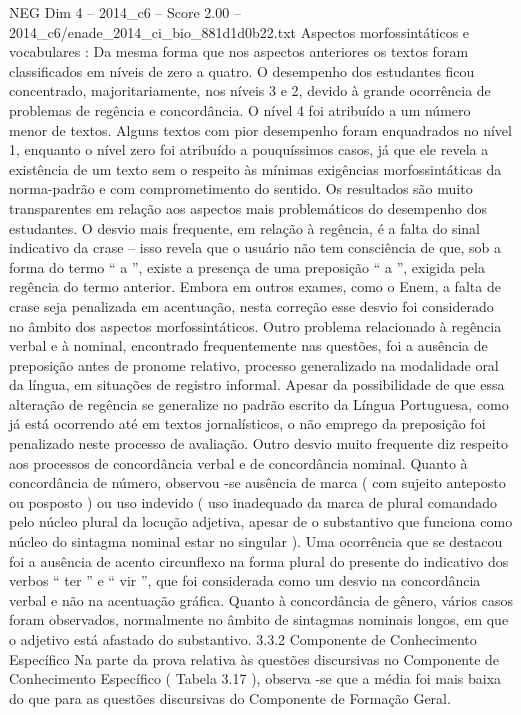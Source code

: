 \begin{textsample}{NEG Dim 4 – 2014\_c6 – Score 2.00 – 2014\_c6/enade\_2014\_ci\_bio\_881d1d0b22.txt}
Aspectos morfossintáticos e vocabulares : Da mesma forma que nos aspectos anteriores os textos foram classificados em níveis de zero a quatro.
O desempenho dos estudantes ficou concentrado, majoritariamente, nos níveis 3 e 2, devido à grande ocorrência de problemas de regência e concordância.
O nível 4 foi atribuído a um número menor de textos.
Alguns textos com pior desempenho foram enquadrados no nível 1, enquanto o nível zero foi atribuído a pouquíssimos casos, já que ele revela a existência de um texto sem o respeito às mínimas exigências morfossintáticas da norma-padrão e com comprometimento do sentido.
Os resultados são muito transparentes em relação aos aspectos mais problemáticos do desempenho dos estudantes.
O desvio mais frequente, em relação à regência, é a falta do sinal indicativo da crase – isso revela que o usuário não tem consciência de que, sob a forma do termo “ a ”, existe a presença de uma preposição “ a ”, exigida pela regência do termo anterior.
Embora em outros exames, como o Enem, a falta de crase seja penalizada em acentuação, nesta correção esse desvio foi considerado no âmbito dos aspectos morfossintáticos.
Outro problema relacionado à regência verbal e à nominal, encontrado frequentemente nas questões, foi a ausência de preposição antes de pronome relativo, processo generalizado na modalidade oral da língua, em situações de registro informal.
Apesar da possibilidade de que essa alteração de regência se generalize no padrão escrito da Língua Portuguesa, como já está ocorrendo até em textos jornalísticos, o não emprego da preposição foi penalizado neste processo de avaliação.
Outro desvio muito frequente diz respeito aos processos de concordância verbal e de concordância nominal.
Quanto à concordância de número, observou -se ausência de marca ( com sujeito anteposto ou posposto ) ou uso indevido ( uso inadequado da marca de plural comandado pelo núcleo plural da locução adjetiva, apesar de o substantivo que funciona como núcleo do sintagma nominal estar no singular ).
Uma ocorrência que se destacou foi a ausência de acento circunflexo na forma plural do presente do indicativo dos verbos “ ter ” e “ vir ”, que foi considerada como um desvio na concordância verbal e não na acentuação gráfica.
Quanto à concordância de gênero, vários casos foram observados, normalmente no âmbito de sintagmas nominais longos, em que o adjetivo está afastado do substantivo. 3.3.2 Componente de Conhecimento Específico Na parte da prova relativa às questões discursivas no Componente de Conhecimento Específico ( Tabela 3.17 ), observa -se que a média foi mais baixa do que para as questões discursivas do Componente de Formação Geral.

\end{textsample}

